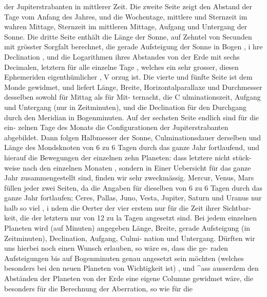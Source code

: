 \documentclass[12pt,a4paper]{article}
\begin{document}
der Jupiterstrabanten in mittlerer Zeit. Die zweite Seite zeigt den Abstand der Tage vom Anfang des Jahres,\newline
und die Wochentage, mittlere und Sternzeit im wahren Mittage, Sternzeit im mittleren Mittage, Aufgang und\newline
Untergang der Sonne. Die dritte Seite enthält die Länge der Sonne, auf Zehntel von Secunden mit grösster\newline
Sorgfalt berechnet, die gerade Aufsteigung der Sonne in Bogen , i hre Declination , und die Logarithmen\newline
ihres Abstandes von der Erde mit sechs Decimalen, letztern für alle einzelne Tage , welches ein sehr grosser,\newline
diesen Ephemeriden eigenthümlicher , V orzug ist. Die vierte und fünfte Seite ist dem Monde gewidmet,\newline
und liefert Länge, Breite, Horizontalparallaxe und Durchmesser desselben sowohl für Mittag als für Mit-\newline
ternacht, die C ulminationszeit, Aufgang und Untergang (nur in Zeitminuten), und die Declination für\newline
den Durchgang durch den Meridian in Bogenminuten. Auf der sechsten Seite endlich sind für die ein-\newline
zelnen Tage des Monats die Configurationen der Jupiterstrabanten abgebildet. Dann folgen Halbmesser\newline
der Sonne, Culminationsdauer derselben und Länge des Mondsknoten von 6 zu 6 Tagen durch das ganze\newline
Jahr fortlaufend, und hierauf die Bewegungen der einzelnen zehn Planeten: dass letztere nicht stück-\newline
weise nach den einzelnen Monaten , sondern in Einer Uebersicht für das ganze Jahr zusammengestellt\newline
sind, finden wir sehr zweckmässig. Mercur, Venus, Mars füllen jeder zwei Seiten, da die Angaben\newline
für dieselben von 6 zu 6 Tagen durch das ganze Jahr fortlaufen; Ceres, Pallas, Juno, Vesta, Jupiter,\newline
Saturn und Uranus nur halb so viel , i ndem die Oerter der vier erstem nur für die Zeit ihrer Sichtbar-\newline
keit, die der letztern nur von 12 zu la Tagen angesetzt sind. Bei jedem einzelnen Planeten wird (auf\newline
Minuten) angegeben Länge, Breite, gerade Aufsteigung (in Zeitminuten), Declination, Aufgang, Culmi-\newline
nation und Untergang. Dürften wir uns hierbei noch einen Wunsch erlauben, so wäre es, dass die ge-\newline
raden Aufsteigungen bis auf Bogenminuten genau angesetzt sein möchten (welches besonders bei den\newline
neuen Planeten von Wichtigkeit ist) , und \^{}ass ausserdem den Abständen der Planeten von der Erde\newline
eine eigene Columne gewidmet wäre, die besonders für die Berechnung der Aberration, so wie für die\newline
\end{document}
